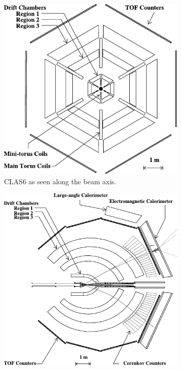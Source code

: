 \documentclass[a4paper,12pt]{article}
\begin{document}
\begin{figure}[H]
    \centering
    \begin{subfigure}[b]{0.45\textwidth}
        \centering
        \includegraphics[width=\textwidth]{figures/CLAS_headon.pdf}
        \caption{CLAS6 as seen along the beam axis.}
    \end{subfigure}
    \hfill
    \begin{subfigure}[b]{0.5\textwidth}
        \centering
        \includegraphics[width=\textwidth]{figures/CLAS_side.pdf}

\end{subfigure}
\end{figure}
\end{document}
